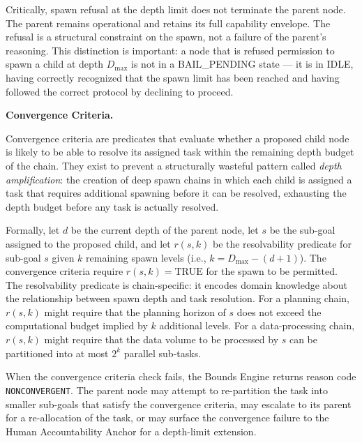 Critically, spawn refusal at the depth limit does not terminate the parent node. The parent remains operational and retains its full capability envelope. The refusal is a structural constraint on the spawn, not a failure of the parent's reasoning. This distinction is important: a node that is refused permission to spawn a child at depth $D_{\max}$ is not in a BAIL\_PENDING state — it is in IDLE, having correctly recognized that the spawn limit has been reached and having followed the correct protocol by declining to proceed.

\bigskip

\noindent\textbf{Convergence Criteria.}

Convergence criteria are predicates that evaluate whether a proposed child node is likely to be able to resolve its assigned task within the remaining depth budget of the chain. They exist to prevent a structurally wasteful pattern called \emph{depth amplification}: the creation of deep spawn chains in which each child is assigned a task that requires additional spawning before it can be resolved, exhausting the depth budget before any task is actually resolved.

Formally, let $d$ be the current depth of the parent node, let $s$ be the sub-goal assigned to the proposed child, and let $r(s, k)$ be the resolvability predicate for sub-goal $s$ given $k$ remaining spawn levels (i.e., $k = D_{\max} - (d+1)$). The convergence criteria require $r(s, k) = \text{TRUE}$ for the spawn to be permitted. The resolvability predicate is chain-specific: it encodes domain knowledge about the relationship between spawn depth and task resolution. For a planning chain, $r(s, k)$ might require that the planning horizon of $s$ does not exceed the computational budget implied by $k$ additional levels. For a data-processing chain, $r(s, k)$ might require that the data volume to be processed by $s$ can be partitioned into at most $2^k$ parallel sub-tasks.

When the convergence criteria check fails, the Bounds Engine returns reason code \texttt{NONCONVERGENT}. The parent node may attempt to re-partition the task into smaller sub-goals that satisfy the convergence criteria, may escalate to its parent for a re-allocation of the task, or may surface the convergence failure to the Human Accountability Anchor for a depth-limit extension.


